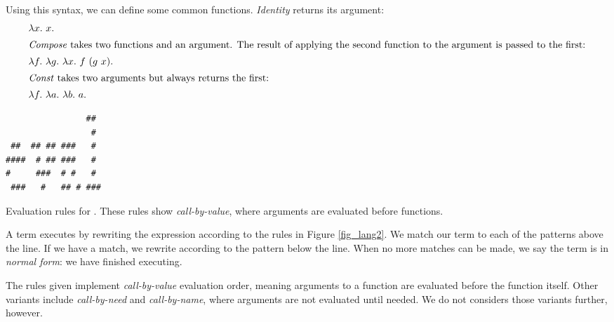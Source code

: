 \documentclass[12pt]{report}
\begin{document}
Using this syntax, we can define some common functions. \emph{Identity} 
returns its argument:
\begin{align}
  & \lambda x.\ x. \\
\intertext{\emph{Compose} takes two functions and an argument. The result of
applying the second function to the argument is passed to the first:}
  & \lambda f.\ \lambda g.\ \lambda x.\ f\ (g\ x). \\
\intertext{\emph{Const} takes two arguments but always returns the first:}
  & \lambda f.\ \lambda a.\ \lambda b.\ a.
\end{align}

\begin{myfig}[bt]
\begin{minipage}{2in}
\begin{Verbatim}
                ##  
                 #  
 ##  ## ## ###   #  
####  # ## ###   #  
#     ###  # #   #  
 ###   #   ## # ### 
\end{Verbatim}
\end{minipage}
  \caption{Evaluation rules for \lamA. These rules show 
    \emph{call-by-value}, where arguments are evaluated
    before functions.}
  \label{fig_lang2}
\end{myfig}

A \lamA term executes by rewriting the expression according to the
rules in Figure \ref{fig_lang2}. We match our term to each of the
patterns above the line. If we have a match, we rewrite according to
the pattern below the line. When no more matches can be made, we say
the term is in \emph{normal form}: we have finished executing.

The rules given implement \emph{call-by-value} evaluation order,
meaning arguments to a function are evaluated before the function
itself. Other variants include \emph{call-by-need} and
\emph{call-by-name}, where arguments are not evaluated until
needed. We do not considers those variants further, however.



\end{document}
